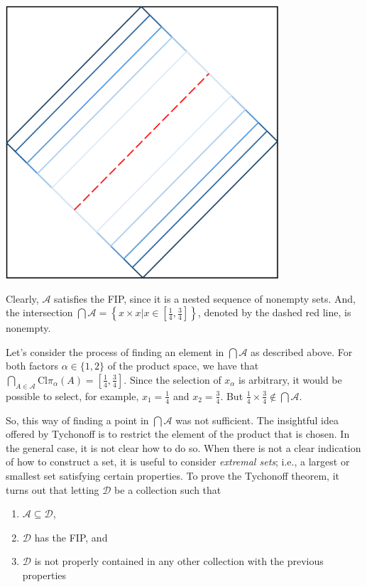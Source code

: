 \documentclass[12pt]{article}
\begin{document}
\begin{center}
\includegraphics[width=4in]{./tut_tychonoff_1.png}
\end{center}

Clearly, $\mathcal{A}$ satisfies the FIP, since it is a nested sequence of nonempty sets. And, the intersection $\bigcap \mathcal{A} = \left\{ x \times x | x \in \left[ \frac{1}{4}, \frac{3}{4} \right] \right\}$, denoted by the dashed red line, is nonempty.

Let's consider the process of finding an element in $\bigcap \mathcal{A}$ as described above. For both factors $\alpha \in \{ 1, 2 \}$ of the product space, we have that $\bigcap_{A \in \mathcal{A}} \text{Cl} \pi_\alpha (A) = \left[ \frac{1}{4}, \frac{3}{4} \right]$. Since the selection of $x_\alpha$ is arbitrary, it would be possible to select, for example, $x_1 = \frac{1}{4}$ and $x_2 = \frac{3}{4}$. But $\frac{1}{4} \times \frac{3}{4} \notin \bigcap \mathcal{A}$.

So, this way of finding a point in $\bigcap \mathcal{A}$ was not sufficient. The insightful idea offered by Tychonoff is to restrict the element of the product that is chosen. In the general case, it is not clear how to do so. When there is not a clear indication of how to construct a set, it is useful to consider \emph{extremal sets}; i.e., a largest or smallest set satisfying certain properties. To prove the Tychonoff theorem, it turns out that letting $\mathcal{D}$ be a collection such that

\begin{enumerate}
\item $\mathcal{A} \subseteq \mathcal{D}$, 
\item $\mathcal{D}$ has the FIP, and
\item $\mathcal{D}$ is not properly contained in any other collection with the previous properties
\end{enumerate}
\end{document}
